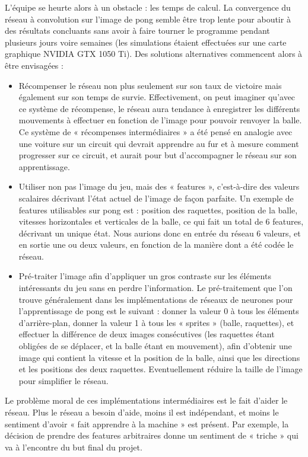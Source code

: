 \documentclass[
    10pt,
    a4paper,
    oneside,
    headinclude,footinclude,
    BCOR=5mm,
    captions=tableabove
]{scrartcl}
\begin{document}
L'équipe se heurte alors à un obstacle : les temps de calcul. La convergence du réseau à convolution sur l’image de pong semble être trop lente pour aboutir à des résultats concluants sans avoir à faire tourner le programme pendant plusieurs jours voire semaines (les simulations étaient effectuées sur une carte graphique NVIDIA GTX 1050 Ti). Des solutions alternatives commencent alors à être envisagées :
\begin{itemize}
\item Récompenser le réseau non plus seulement sur son taux de victoire mais également sur son temps de survie. Effectivement, on peut imaginer qu’avec ce système de récompense, le réseau aura tendance à enregistrer les différents mouvements à effectuer en fonction de l’image pour pouvoir renvoyer la balle.
Ce système de « récompenses intermédiaires » a été pensé en analogie avec une voiture sur un circuit qui devrait apprendre au fur et à mesure comment progresser sur ce circuit, et aurait pour but d’accompagner le réseau sur son apprentissage.  %
\item Utiliser non pas l’image du jeu, mais des « features », c’est-à-dire des valeurs scalaires décrivant l’état actuel de l’image de façon parfaite. Un exemple de features utilisables sur pong est : position des raquettes, position de la balle, vitesses horizontales et verticales de la balle, ce qui fait un total de 6 features, décrivant un unique état. Nous aurions donc en entrée du réseau 6 valeurs, et en sortie une ou deux valeurs, en fonction de la manière dont a été codée le réseau.
\item Pré-traiter l’image afin d’appliquer un gros contraste sur les éléments intéressants du jeu sans en perdre l’information. Le pré-traitement que l’on trouve généralement dans les implémentations de réseaux de neurones pour l’apprentissage de pong est le suivant : donner la valeur 0 à tous les éléments d’arrière-plan, donner la valeur 1 à tous les « sprites » (balle, raquettes), et effectuer la différence de deux images consécutives (les raquettes étant obligées de se déplacer, et la balle étant en mouvement), afin d’obtenir une image qui contient la vitesse et la position de la balle, ainsi que les directions et les positions des deux raquettes. Eventuellement réduire la taille de l’image pour simplifier le réseau.
\end{itemize}

Le problème moral de ces implémentations intermédiaires est le fait d’aider le réseau. Plus le réseau a besoin d’aide, moins il est indépendant, et moins le sentiment d’avoir « fait apprendre à la machine » est présent. Par exemple, la décision de prendre des features arbitraires donne un sentiment de « triche » qui va à l’encontre du but final du projet. 
\end{document}
